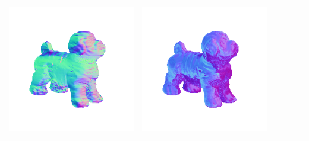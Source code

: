\begin{center}
\begin{tabularx}{\linewidth}{@{}Y@{}Y@{}Y@{}Y@{}Y@{}Y@{}}
\includegraphics[width=\linewidth]{semisynthetic/20150514_17_yu_out.png} &
\includegraphics[width=\linewidth]{semisynthetic/20150514_17_dpsn_out.png} &

\end{tabularx}
\end{center}
